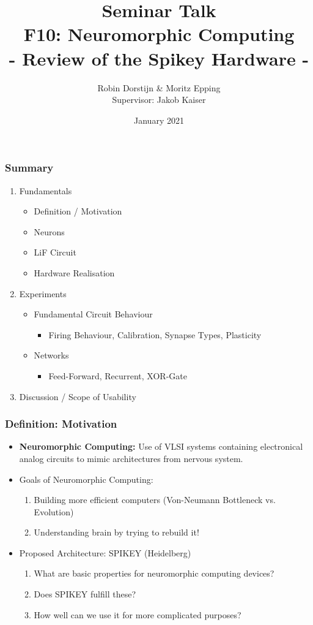 \documentclass{beamer}
\title{Seminar Talk \\ F10: Neuromorphic Computing\\
- Review of the Spikey Hardware - }
\author{Robin Dorstijn \& Moritz Epping \\ Supervisor: Jakob Kaiser}
\institute{Universität Heidelberg}
\date{January 2021}
\begin{document}
\expandafter\def\expandafter\insertshorttitle\expandafter{%
  \insertshorttitle\hfill%
  \insertframenumber\,/\,\inserttotalframenumber}


\frame{\titlepage}

\begin{frame}
    \frametitle{Summary}
    \begin{enumerate}
        \item Fundamentals
        \begin{itemize}
        		\item Definition / Motivation
        		\item Neurons
        		\item LiF Circuit
        		\item Hardware Realisation
        \end{itemize}
        \item Experiments
        \begin{itemize}
        		\item Fundamental Circuit Behaviour
        		\begin{itemize}
        			\item Firing Behaviour,  Calibration,  Synapse Types,  Plasticity
        		\end{itemize}
        		\item Networks
        		\begin{itemize}
        			\item Feed-Forward,  Recurrent,  XOR-Gate
        		\end{itemize}
        \end{itemize}
        \item Discussion / Scope of Usability
    \end{enumerate}
\end{frame}

\begin{frame}
    \frametitle{Definition: Motivation}
   	\begin{itemize}
   		\item \textbf{Neuromorphic Computing:} Use of VLSI systems containing
   		electronical analog circuits to mimic architectures from nervous system.
   		\item Goals of Neuromorphic Computing:
   		\begin{enumerate}
   			\item Building more efficient computers (Von-Neumann Bottleneck vs.  Evolution)
   			\item  Understanding brain by trying to rebuild it!
   		\end{enumerate}
   		\bigskip
   		\item Proposed Architecture: SPIKEY (Heidelberg)
   		\begin{enumerate}
   			\item What are basic properties for neuromorphic computing devices?
   			\item Does SPIKEY fulfill these?
   			\item How well can we use it for more complicated purposes?
   		\end{enumerate}
   	\end{itemize}
\end{frame}
\end{document}
